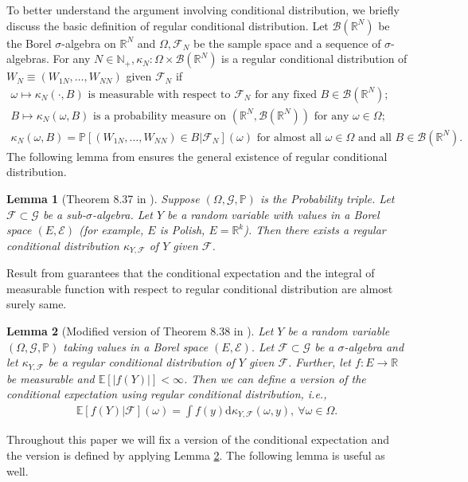 \documentclass[12pt]{article}
\newtheorem{lemma}{Lemma}
\def\P{\mathbb{P}}
\def\P{\mathbb{P}}
\newcommand{\E}{\mathbb E}								%
\renewcommand{\P}{\mathbb{P}}							%
\begin{document}
To better understand the argument involving conditional distribution, we briefly discuss the basic definition of regular conditional distribution. Let $\mathcal{B}(\mathbb{R}^N)$ be the Borel $\sigma$-algebra on $\mathbb{R}^N$ and $\Omega,\mathcal{F}_N$ be the sample space and a sequence of $\sigma$-algebras. For any $N\in\mathbb{N}_+,\kappa_N:\Omega\times \mathcal{B}(\mathbb{R}^N)$ is a regular conditional distribution of $W_N\equiv (W_{1N},\ldots,W_{NN})$ given $\mathcal{F}_N$ if 
\begin{align*}
	\omega\mapsto \kappa_N(\cdot,B) \text{ is measurable with respect to $\mathcal{F}_N$ for any fixed $B\in\mathcal{B}(\mathbb{R}^N)$};
	&
	\\
	B\mapsto \kappa_N(\omega,B) \text{ is a probability measure on }(\mathbb{R}^N,\mathcal{B}(\mathbb{R}^N)) \text{ for any }\omega\in\Omega;
	&
	\\
	\kappa_N(\omega,B)=\P[(W_{1N},\ldots,W_{NN})\in B|\mathcal{F}_N](\omega)\text{ for almost all }\omega\in\Omega\text{ and all }B\in\mathcal{B}(\mathbb{R}^N).&
\end{align*}
The following lemma from \citet[Theorem 8.37]{Lista2017} ensures the general existence of regular conditional distribution.
\begin{lemma}[Theorem 8.37 in \citet{Lista2017}]\label{lem:Klenke_Thm_8.37}
  Suppose $(\Omega,\mathcal{G},\P)$ is the Probability triple. Let $\mathcal{F}\subset \mathcal{G}$ be a sub-$\sigma$-algebra. Let $Y$ be a random variable with values in a Borel space $(E,\mathcal{E})$ (for example, $E$ is Polish, $E=\mathbb{R}^k$). Then there exists a regular conditional distribution $\kappa_{Y,\mathcal{F}}$ of $Y$ given $\mathcal{F}$.
\end{lemma}
\noindent Result from \citet[Theorem 8.38]{Lista2017} guarantees that the conditional expectation and the integral of measurable function with respect to regular conditional distribution are almost surely same.

\begin{lemma}[Modified version of Theorem 8.38 in \citet{Lista2017}]\label{lem:Klenke_Thm_8.38}
  Let $Y$ be a random variable $(\Omega,\mathcal{G},\mathbb{P})$ taking values in a Borel space $(E,\mathcal{E})$. Let $\mathcal{F}\subset \mathcal{G}$ be a $\sigma$-algebra and let $\kappa_{Y,\mathcal{F}}$ be a regular conditional distribution of $Y$ given $\mathcal{F}$. Further, let $f:E\rightarrow\mathbb{R}$ be measurable and $\E[|f(Y)|]<\infty$. Then we can define a version of the conditional expectation using regular conditional distribution, i.e., 
  \begin{align*}
    \E[f(Y)|\mathcal{F}](\omega)=\int f(y)\mathrm{d}\kappa_{Y,\mathcal{F}}(\omega,y),\ \forall \omega\in\Omega.
  \end{align*}
\end{lemma}
\noindent Throughout this paper we will fix a version of the conditional expectation and the version is defined by applying Lemma \ref{lem:Klenke_Thm_8.38}. The following lemma is useful as well. 
\end{document}
